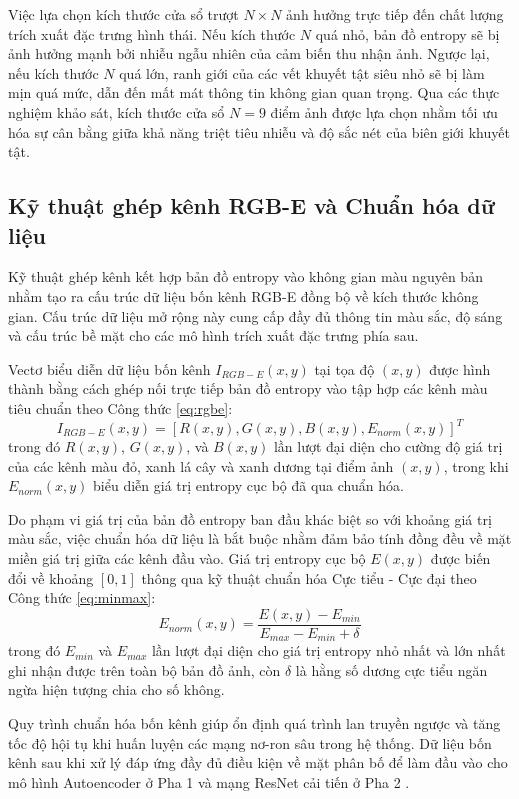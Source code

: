 Việc lựa chọn kích thước cửa sổ trượt $N \times N$ ảnh hưởng trực tiếp đến chất lượng trích xuất đặc trưng hình thái. Nếu kích thước $N$ quá nhỏ, bản đồ entropy sẽ bị ảnh hưởng mạnh bởi nhiễu ngẫu nhiên của cảm biến thu nhận ảnh. Ngược lại, nếu kích thước $N$ quá lớn, ranh giới của các vết khuyết tật siêu nhỏ sẽ bị làm mịn quá mức, dẫn đến mất mát thông tin không gian quan trọng. Qua các thực nghiệm khảo sát, kích thước cửa sổ $N = 9$ điểm ảnh được lựa chọn nhằm tối ưu hóa sự cân bằng giữa khả năng triệt tiêu nhiễu và độ sắc nét của biên giới khuyết tật.

\subsection{Kỹ thuật ghép kênh RGB-E và Chuẩn hóa dữ liệu}
\label{subsec:channel_concatenation}

Kỹ thuật ghép kênh kết hợp bản đồ entropy vào không gian màu nguyên bản nhằm tạo ra cấu trúc dữ liệu bốn kênh RGB-E đồng bộ về kích thước không gian. Cấu trúc dữ liệu mở rộng này cung cấp đầy đủ thông tin màu sắc, độ sáng và cấu trúc bề mặt cho các mô hình trích xuất đặc trưng phía sau.

Vectơ biểu diễn dữ liệu bốn kênh $I_{RGB-E}(x,y)$ tại tọa độ $(x,y)$ được hình thành bằng cách ghép nối trực tiếp bản đồ entropy vào tập hợp các kênh màu tiêu chuẩn theo Công thức \ref{eq:rgbe}:
\begin{equation}
\label{eq:rgbe}
I_{RGB-E}(x,y) = \left[ R(x,y), G(x,y), B(x,y), E_{norm}(x,y) \right]^T
\end{equation}
trong đó $R(x,y)$, $G(x,y)$, và $B(x,y)$ lần lượt đại diện cho cường độ giá trị của các kênh màu đỏ, xanh lá cây và xanh dương tại điểm ảnh $(x,y)$, trong khi $E_{norm}(x,y)$ biểu diễn giá trị entropy cục bộ đã qua chuẩn hóa.

Do phạm vi giá trị của bản đồ entropy ban đầu khác biệt so với khoảng giá trị màu sắc, việc chuẩn hóa dữ liệu là bắt buộc nhằm đảm bảo tính đồng đều về mặt miền giá trị giữa các kênh đầu vào. Giá trị entropy cục bộ $E(x,y)$ được biến đổi về khoảng $[0, 1]$ thông qua kỹ thuật chuẩn hóa Cực tiểu - Cực đại theo Công thức \ref{eq:minmax}:
\begin{equation}
\label{eq:minmax}
E_{norm}(x,y) = \frac{E(x,y) - E_{min}}{E_{max} - E_{min} + \delta}
\end{equation}
trong đó $E_{min}$ và $E_{max}$ lần lượt đại diện cho giá trị entropy nhỏ nhất và lớn nhất ghi nhận được trên toàn bộ bản đồ ảnh, còn $\delta$ là hằng số dương cực tiểu ngăn ngừa hiện tượng chia cho số không.

Quy trình chuẩn hóa bốn kênh giúp ổn định quá trình lan truyền ngược và tăng tốc độ hội tụ khi huấn luyện các mạng nơ-ron sâu trong hệ thống. Dữ liệu bốn kênh sau khi xử lý đáp ứng đầy đủ điều kiện về mặt phân bố để làm đầu vào cho mô hình Autoencoder ở Pha 1 và mạng ResNet cải tiến ở Pha 2 \cite{he2016deep}.
